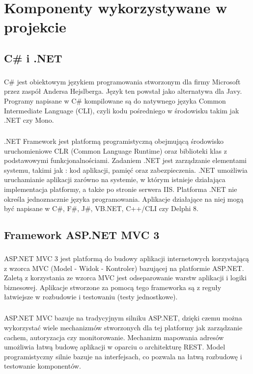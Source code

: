 \chapter{Komponenty wykorzystywane w projekcie}

\section{ C\# i .NET }
\paragraph{}
C\# jest obiektowym językiem programowania stworzonym dla firmy Microsoft przez zaspół Andersa Hejslberga. Język ten powstał jako alternatywa dla Javy. Programy napisane w C\# kompilowane są do natywnego języka Common Intermediate Language (CLI), czyli kodu pośredniego w środowisku takim jak .NET czy Mono.
\paragraph{}
.NET Framework jest platformą programistyczną obejmującą środowisko uruchomieniowe CLR (Common Language Runtime) oraz biblioteki klas z podstawowymi funkcjonalnościami. Zadaniem .NET jest zarządzanie elementami systemu, takimi jak : kod aplikacji, pamięć oraz zabezpieczenia. .NET umożliwia uruchamianie aplikacji zarówno na systemie, w którym istnieje działająca implementacja platformy, a także po stronie serwera IIS. Platforma .NET nie określa jednoznacznie języka programowania. Aplikacje działające na niej mogą być napisane w C\#, F\#, J\#, VB.NET, C++/CLI czy Delphi 8. 

\section{Framework ASP.NET MVC 3}

\paragraph{}
ASP.NET MVC 3 jest platformą do budowy aplikacji internetowych korzystającą z wzorca MVC (Model - Widok - Kontroler) bazującej na platformie ASP.NET. Zaletą z korzystania ze wzorca MVC jest odseparowanie warstw aplikacji i logiki biznesowej. Aplikacje stworzone za pomocą tego frameworka są z reguły łatwiejsze w rozbudowie i testowaniu (testy jednostkowe).

\paragraph{}
ASP.NET MVC bazuje na tradycyjnym silniku ASP.NET, dzięki czemu można wykorzystać wiele mechanizmów stworzonych dla tej platformy jak zarządzanie cachem, autoryzacja czy monitorowanie. Mechanizm mapowania adresów umożliwia łatwą budowę aplikacji w oparciu o architekturę REST. Model programistyczny silnie bazuje na interfejsach, co pozwala na łatwą rozbudowę i testowanie komponentów.

